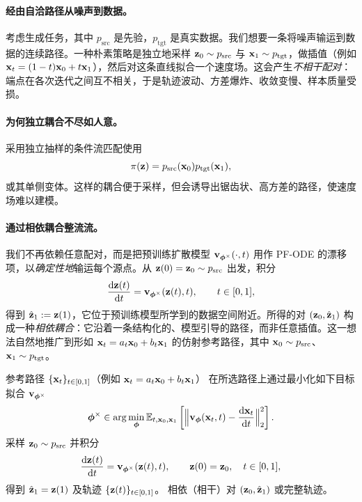 \paragraph{经由自洽路径从噪声到数据。}
考虑生成任务，其中 $p_{\text{src}}$ 是先验，$p_{\text{tgt}}$ 是真实数据。我们想要一条将噪声输运到数据的连续路径。一种朴素策略是独立地采样 ${\mathbf{z}}_0 \sim p_{\text{src}}$ 与 ${\mathbf{x}}_1 \sim p_{\text{tgt}}$，做插值（例如 ${\mathbf{x}}_t=(1-t){\mathbf{x}}_0+t{\mathbf{x}}_1$），然后对这条直线拟合一个速度场。这会产生\emph{不相干配对}：端点在各次迭代之间互不相关，于是轨迹波动、方差爆炸、收敛变慢、样本质量受损。

\paragraph{为何独立耦合不尽如人意。}
采用独立抽样的条件流匹配使用
\[
\pi({\mathbf{z}})=p_{\text{src}}({\mathbf{x}}_0) p_{\text{tgt}}({\mathbf{x}}_1),
\]
或其单侧变体。这样的耦合便于采样，但会诱导出锯齿状、高方差的路径，使速度场难以建模。

\paragraph{通过相依耦合整流流。}
我们不再依赖任意配对，而是把预训练扩散模型 ${\mathbf{v}}_{{\bm{\phi}}^\times}(\cdot,t)$ 用作 PF-ODE 的漂移项，以\emph{确定性地}输运每个源点。从 ${\mathbf{z}}(0)={\mathbf{z}}_0 \sim p_{\text{src}}$ 出发，积分
\[
\frac{\mathop{}\!\mathrm{d} {\mathbf{z}}(t)}{\mathop{}\!\mathrm{d} t} = {\mathbf{v}}_{{\bm{\phi}}^\times}({\mathbf{z}}(t),t), \qquad t \in [0,1],
\]
得到 $\hat{{\mathbf{z}}}_1 := {\mathbf{z}}(1)$，它位于预训练模型所学到的数据空间附近。所得的对 $({\mathbf{z}}_0,\hat{{\mathbf{z}}}_1)$ 构成一种\emph{相依耦合}：它沿着一条结构化的、模型引导的路径，而非任意插值。这一想法自然地推广到形如 ${\mathbf{x}}_t = a_t {\mathbf{x}}_0 + b_t {\mathbf{x}}_1$ 的仿射参考路径，其中 ${\mathbf{x}}_0 \sim p_{\text{src}}$、${\mathbf{x}}_1 \sim p_{\text{tgt}}$。



\begin{algorithm}[H]
\caption{\texttt{Rectify} 操作\label{alg:Rectify}}
\begin{algorithmic}[1]
\Require 参考路径 $\{{\mathbf{x}}_t\}_{t\in[0,1]}$（例如 ${\mathbf{x}}_t=a_t{\mathbf{x}}_0+b_t{\mathbf{x}}_1$）
\State {} 在所选路径上通过最小化如下目标拟合 ${\mathbf{v}}_{{\bm{\phi}}^\times}$
\[
{\bm{\phi}}^\times \in \arg\min_{{\bm{\phi}}} 
\mathbb{E}_{t,{\mathbf{x}}_0,{\mathbf{x}}_1} \left[\Big\|{\mathbf{v}}_{{\bm{\phi}}}({\mathbf{x}}_t,t)-\frac{\mathop{}\!\mathrm{d} {\mathbf{x}}_t}{\mathop{}\!\mathrm{d} t}\Big\|_2^2\right].
\]
\State {} 采样 ${\mathbf{z}}_0 \sim p_{\text{src}}$ 并积分
\[
\frac{\mathop{}\!\mathrm{d} {\mathbf{z}}(t)}{\mathop{}\!\mathrm{d} t}={\mathbf{v}}_{{\bm{\phi}}^\times}({\mathbf{z}}(t),t),\qquad {\mathbf{z}}(0)={\mathbf{z}}_0,\quad t\in[0,1],
\]
得到 $\hat{{\mathbf{z}}}_1={\mathbf{z}}(1)$ 及轨迹 $\{{\mathbf{z}}(t)\}_{t\in[0,1]}$。
\Ensure 相依（相干）对 $({\mathbf{z}}_0,\hat{{\mathbf{z}}}_1)$ 或完整轨迹。
\end{algorithmic}
\end{algorithm}

